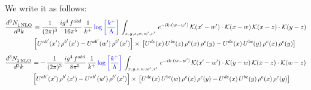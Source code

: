 \documentclass[9pt]{article}
\numberwithin{equation}{section}
\begin{document}
We write it as follows: 
\begin{align}
   \frac{d^{3}N_{1\,\rm NLO}^{\rm}}{d^{3}k}  & = \frac{1}{(2\pi)^{3}}\,\frac{ig^{4}\,f^{abd}}{16\pi^{5}}\,\frac{1}{k^{+}}\,{\color{blue}\log{\left[\frac{k^{+}}{\Lambda}\right]}}\,\int_{x,y,z,w,w',x'}\,e^{-ik\cdot (w-w')}\, \mathcal{K}(x'-w')\cdot \mathcal{K}(x-w)\, \mathcal{K}(x-z)\cdot \mathcal{K}(y-z) \notag \\ & \left[U^{ab'}(x')\,\rho^{b'}(x')-U^{ab'}(w')\, \rho^{b'}(x')\right]\times\, \left[U^{de}(x)\,U^{bc}(z)\, \rho^{e}(x)\,\rho^{c}(y)-U^{de}(x)\,U^{bc}(y)\,\rho^{e}(x)\,\rho^{c}(y)\right]
\end{align}
\begin{align}
   \frac{d^{3}N_{2\,\rm NLO}^{\rm}}{d^{3}k}  & = -\,\frac{1}{(2\pi)^{3}}\, \frac{ig^{4}\, f^{abd}}{8\pi^{5}}\, \frac{1}{k^{+}}\,{\color{blue}\log{\left[\frac{k^{+}}{\Lambda}\right]}}\,\int_{x,y,z,w,w',x'}\,e^{-ik\cdot (w-w')}\, \mathcal{K}(x'-w')\cdot \mathcal{K}(y-w)\,\mathcal{K}(x-z)\cdot \mathcal{K}(w-z) \notag \\ & \left[U^{ab'}(x')\,\rho^{b'}(x')-U^{ab'}(w')\, \rho^{b'}(x')\right]\times\,\left[U^{de}(x)\,U^{bc}(w)\, \rho^{e}(x)\,\rho^{c}(y)-U^{de}(x)\,U^{bc}(y)\,\rho^{e}(x)\,\rho^{c}(y)\right] 
\end{align}
\end{document}
